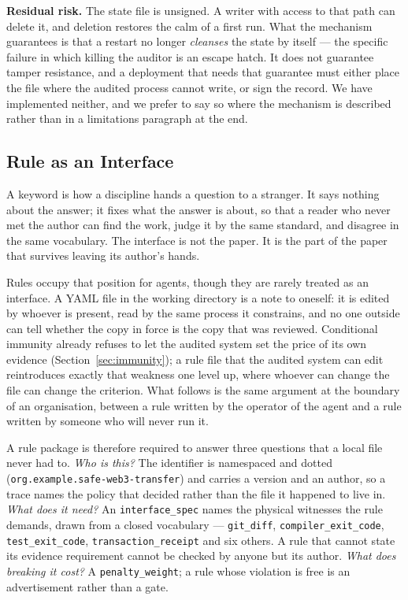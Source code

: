 \documentclass[conference]{IEEEtran}
\begin{document}
\textbf{Residual risk.}
The state file is unsigned. A writer with access to that path can delete it, and
deletion restores the calm of a first run. What the mechanism guarantees is that
a restart no longer \emph{cleanses} the state by itself --- the specific failure in
which killing the auditor is an escape hatch. It does not guarantee tamper
resistance, and a deployment that needs that guarantee must either place the file
where the audited process cannot write, or sign the record. We have implemented
neither, and we prefer to say so where the mechanism is described rather than in
a limitations paragraph at the end.

\subsection{Rule as an Interface}
\label{sec:rules}

A keyword is how a discipline hands a question to a stranger. It says nothing
about the answer; it fixes what the answer is about, so that a reader who never
met the author can find the work, judge it by the same standard, and disagree in
the same vocabulary. The interface is not the paper. It is the part of the paper
that survives leaving its author's hands.

Rules occupy that position for agents, though they are rarely treated as an
interface. A YAML file in the working directory is a note to oneself: it is
edited by whoever is present, read by the same process it constrains, and no one
outside can tell whether the copy in force is the copy that was reviewed.
Conditional immunity already refuses to let the audited system set the price of
its own evidence (Section~\ref{sec:immunity}); a rule file that the audited
system can edit reintroduces exactly that weakness one level up, where whoever
can change the file can change the criterion. What follows is the same argument
at the boundary of an organisation, between a rule written by the operator of the
agent and a rule written by someone who will never run it.

A rule package is therefore required to answer three questions that a local file
never had to. \emph{Who is this?} The identifier is namespaced and dotted
(\texttt{org.example.}\allowbreak\texttt{safe-web3-transfer}) and carries a
version and an author,
so a trace names the policy that decided rather than the file it happened to live
in. \emph{What does it need?} An \texttt{interface\_spec} names the physical
witnesses the rule demands, drawn from a closed vocabulary --- \texttt{git\_diff},
\texttt{compiler\_exit\_code}, \texttt{test\_exit\_code},
\texttt{transaction\_receipt} and six others. A rule that cannot state its
evidence requirement cannot be checked by anyone but its author. \emph{What does
breaking it cost?} A \texttt{penalty\_weight}; a rule whose violation is free is
an advertisement rather than a gate.
\end{document}
